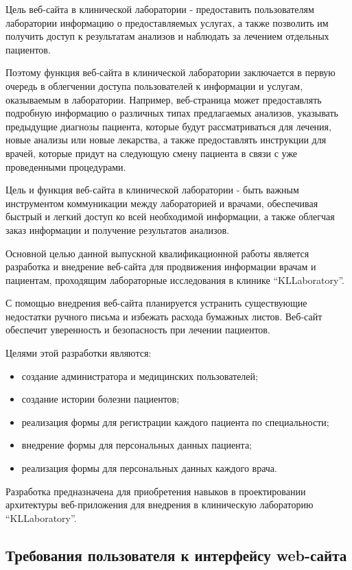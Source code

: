 Цель веб-сайта в клинической лаборатории - предоставить пользователям лаборатории информацию о предоставляемых услугах, а также позволить им получить доступ к результатам анализов и наблюдать за лечением отдельных пациентов.

Поэтому функция веб-сайта в клинической лаборатории заключается в первую очередь в облегчении доступа пользователей к информации и услугам, оказываемым в лаборатории. Например, веб-страница может предоставлять подробную информацию о различных типах предлагаемых анализов, указывать предыдущие диагнозы пациента, которые будут рассматриваться для лечения, новые анализы или новые лекарства, а также предоставлять инструкции для врачей, которые придут на следующую смену пациента в связи с уже проведенными процедурами.

Цель и функция веб-сайта в клинической лаборатории - быть важным инструментом коммуникации между лабораторией и врачами, обеспечивая быстрый и легкий доступ ко всей необходимой информации, а также облегчая заказ информации и получение результатов анализов.

Основной целью данной выпускной квалификационной работы является разработка и внедрение веб-сайта для продвижения информации врачам и пациентам, проходящим лабораторные исследования в клинике ``KLLaboratory''.

С помощью внедрения веб-сайта планируется устранить существующие недостатки ручного письма и избежать расхода бумажных листов. Веб-сайт обеспечит уверенность и безопасность при лечении пациентов.

Целями этой разработки являются:
\begin{itemize}
\item создание администратора и медицинских пользователей;
\item создание истории болезни пациентов;
\item реализация формы для регистрации каждого пациента по специальности;
\item внедрение формы для персональных данных пациента;
\item реализация формы для персональных данных каждого врача.
\end{itemize}

Разработка предназначена для приобретения навыков в проектировании архитектуры веб-приложения для внедрения в клиническую лабораторию ``KLLaboratory''.

\subsection{Требования пользователя к интерфейсу web-сайта}

